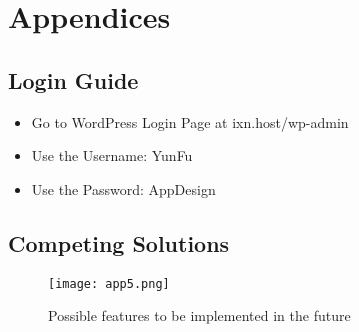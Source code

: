 \newpage

% 

\printbibliography


\newpage
\section{Appendices}

\subsection{Login Guide}
\begin{itemize}

  \item Go to WordPress Login Page at ixn.host/wp-admin
  \item Use the Username: YunFu
  \item Use the Password: AppDesign

\end{itemize}

\begin{landscape}
\subsection{Competing Solutions}
  \begin{figure}[H]
      \centering
      \texttt{[image: app5.png]}
      \caption{Possible features to be implemented in the future}
 \end{figure}
 \end{landscape}


